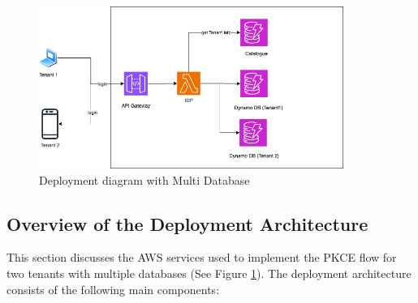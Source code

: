 \begin{figure}[h!]
\centering
\label{fig:deployment_diagram_dual}
\includegraphics[width=\textwidth, height=200px]{pics/deployment_diagram.dual.png}
\caption{Deployment diagram with Multi Database}
\end{figure}

\subsection{Overview of the Deployment Architecture}
This section discusses the AWS services used to implement the PKCE flow for two tenants with multiple databases (See Figure \ref{fig:deployment_diagram_dual}). The deployment architecture consists of the following main components:

